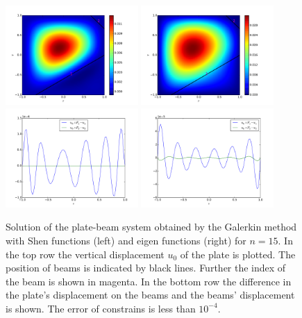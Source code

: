 \documentclass{marine_2015}
\begin{document}
 \begin{figure}[ht]
 \centering
 \includegraphics[width=0.45\textwidth]{img/shen_u0}
 \includegraphics[width=0.45\textwidth]{img/sine_u0}\\
 \includegraphics[width=0.45\textwidth]{img/shen_u0_ur}
 \includegraphics[width=0.45\textwidth]{img/sine_u0_ur}\\
 \caption{
  Solution of the plate-beam system obtained by the Galerkin method with Shen
  functions (left) and eigen functions (right) for $n=15$. In the top row the vertical
  displacement $u_0$ of the plate is plotted. The position of beams is indicated
  by black lines. Further the index of the beam is shown in magenta. In the
  bottom row the difference in the plate's displacement on the beams and the
  beams' displacement is shown. The error of constrains is less than $10^{-4}$.
 }
 \label{fig:solutions}
 \end{figure}
\end{document}
